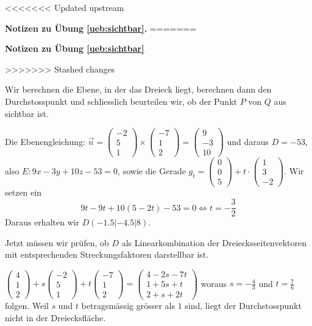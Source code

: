 \documentclass[%
11pt,%
twoside,%
titlepage,%
<<<<<<< Updated upstream
german,%
=======
swissgerman,%
>>>>>>> Stashed changes
headsepline%
]{scrartcl}
\newcommand{\faReturnGray}{\textcolor{gray}{\faMailReply}} %
\theoremstyle{definition}
\theoremstyle{plain}
\newcommand{\concatueb}[1]{ueb:#1}%
\newcommand{\concatlsg}[1]{lsg:#1}%
\newenvironment{lsg}[1]{%
<<<<<<< Updated upstream
    \par\noindent\textbf{Notizen zu Übung \ref{\concatueb{#1}}.}%
    \label{\concatlsg{#1}}
=======
    \par\noindent\textbf{Notizen zu Übung \ref{\concatueb{#1}}}\label{\concatlsg{#1}}
    \hfill\hyperref[\concatueb{#1}]{\faReturnGray}\par %
>>>>>>> Stashed changes
}{%
    \par%
}
\begin{document}
\begin{lsg}{sichtbar}
Wir berechnen die Ebene, in der das Dreieck liegt, berechnen dann den Durchstosspunkt und schliesslich beurteilen wir, ob der Punkt $P$ von $Q$ aus sichtbar ist.

Die Ebenengleichung: $\vec{n}=\begin{pmatrix}
    -2\\5\\1
\end{pmatrix}\times\begin{pmatrix}
    -7\\1\\2
\end{pmatrix}=\begin{pmatrix}
    9\\-3\\10
\end{pmatrix}$ und daraus $D=-53$, also $E: 9x-3y+10z-53=0$, sowie die Gerade $g_t=\begin{pmatrix}
    0\\0\\5
\end{pmatrix}+t\cdot\begin{pmatrix}
    1\\3\\-2
\end{pmatrix}$. Wir setzen ein
$$9t-9t+10(5-2t)-53=0\Leftrightarrow t=-\frac{3}{2}$$
Daraus erhalten wir $D(-1.5|-4.5|8)$.

Jetzt müssen wir prüfen, ob $D$ als Linearkombination der Dreiecksseitenvektoren mit entsprechenden Streckungsfaktoren darstellbar ist.

$\begin{pmatrix}
    4\\1\\2
\end{pmatrix}+s\begin{pmatrix}
    -2\\5\\1
\end{pmatrix}+t\begin{pmatrix}
    -7\\1\\2
\end{pmatrix}=\begin{pmatrix}
    4-2s-7t\\1+5s+t\\2+s+2t
\end{pmatrix}$
woraus $s=-\frac{4}{3}$ und $t=\frac{7}{6}$ folgen. Weil $s$ und $t$ betragsmässig grösser als $1$ sind, liegt der Durchstosspunkt nicht in der Dreiecksfläche.
\end{lsg}
\end{document}
